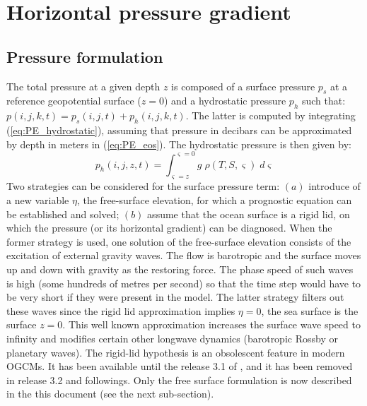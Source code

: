 \documentclass[../main/NEMO_manual]{subfiles}
\begin{document}
\section{Horizontal pressure gradient}
\label{sec:PE_hor_pg}

\subsection{Pressure formulation}
\label{subsec:PE_p_formulation}

The total pressure at a given depth $z$ is composed of a surface pressure $p_s$ at
a reference geopotential surface ($z = 0$) and a hydrostatic pressure $p_h$ such that:
$p(i,j,k,t) = p_s(i,j,t) + p_h(i,j,k,t)$.
The latter is computed by integrating (\autoref{eq:PE_hydrostatic}),
assuming that pressure in decibars can be approximated by depth in meters in (\autoref{eq:PE_eos}).
The hydrostatic pressure is then given by:
\[
  p_h (i,j,z,t) = \int_{\varsigma = z}^{\varsigma = 0} g \; \rho (T,S,\varsigma) \; d \varsigma
\]
Two strategies can be considered for the surface pressure term:
$(a)$ introduce of a  new variable $\eta$, the free-surface elevation,
for which a prognostic equation can be established and solved;
$(b)$ assume that the ocean surface is a rigid lid,
on which the pressure (or its horizontal gradient) can be diagnosed.
When the former strategy is used, one solution of the free-surface elevation consists of
the excitation of external gravity waves.
The flow is barotropic and the surface moves up and down with gravity as the restoring force.
The phase speed of such waves is high (some hundreds of metres per second) so that
the time step would have to be very short if they were present in the model.
The latter strategy filters out these waves since the rigid lid approximation implies $\eta = 0$,
\ie the sea surface is the surface $z = 0$.
This well known approximation increases the surface wave speed to infinity and
modifies certain other longwave dynamics (\eg barotropic Rossby or planetary waves).
The rigid-lid hypothesis is an obsolescent feature in modern OGCMs.
It has been available until the release 3.1 of \NEMO, and it has been removed in release 3.2 and followings.
Only the free surface formulation is now described in the this document (see the next sub-section).
\end{document}
